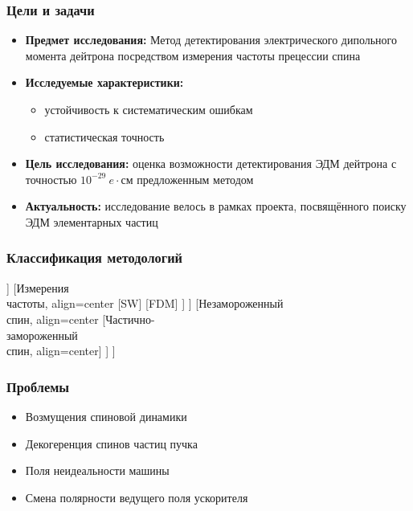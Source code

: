 \documentclass[14pt]{beamer}
\begin{document}
\begin{frame}
\frametitle{Цели и задачи}
\begin{itemize}
  \item \textbf{Предмет исследования:} Метод детектирования электрического дипольного момента дейтрона посредством измерения частоты прецессии спина
  \item \textbf{Исследуемые характеристики:} 
  \begin{itemize}
  	\item устойчивость к систематическим ошибкам
  	\item статистическая точность
  \end{itemize}
  \item \textbf{Цель исследования:} оценка возможности детектирования ЭДМ дейтрона с точностью $10^{-29}~e\cdot$см предложенным методом
  \item \textbf{Актуальность:} исследование велось в рамках проекта, посвящённого поиску ЭДМ элементарных частиц
\end{itemize}
\end{frame}
\begin{frame}\frametitle{Классификация методологий}
\begin{forest}
	[SR EDM
	[Замороженный\\ спин, align=center
	[Измерения\\ амплитуды, align=center
	[BNL FS]
	[D-MR]
	]
	[Измерения\\ частоты, align=center
	[SW]
	[FDM]
	]
	]
	[Незамороженный\\ спин, align=center
	[Частично-\\замороженный\\спин, align=center]
	]
	]
\end{forest}
\end{frame}
\begin{frame}
\frametitle{Проблемы}
\begin{itemize}
  \item Возмущения спиновой динамики
  \item Декогеренция спинов частиц пучка
  \item Поля неидеальности машины
  \item Смена полярности ведущего поля ускорителя
\end{itemize}
\end{frame}
\end{document}
